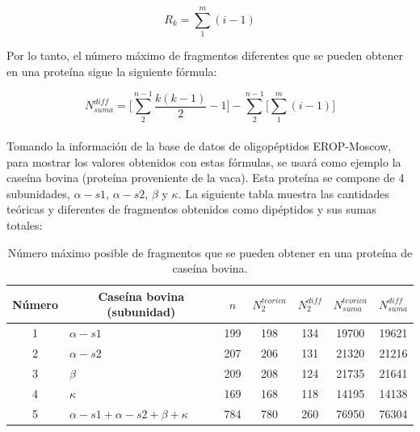 \begin{equation}
R_{k}=\sum_{1}^{m}(i-1)
\end{equation}

Por lo tanto, el número máximo de fragmentos diferentes que se pueden obtener en una proteína sigue la siguiente fórmula:

\begin{equation}
N_{suma}^{diff}=\Bigg[\sum_{2}^{n-1} \frac{k(k-1)}{2}-1\Bigg]- \sum_{2}^{n-1}\Bigg[\sum_{1}^{m}(i-1)\Bigg]
\end{equation}
\\
Tomando la información de la base de datos de oligopéptidos EROP-Moscow, para mostrar los valores obtenidos con estas fórmulas, se usará como ejemplo la caseína bovina (proteína proveniente de la vaca). Esta proteína se compone de 4 subunidades, $\alpha - s1$, $\alpha -s2$, $\beta$ y $\kappa$. La siguiente tabla muestra las cantidades teóricas y diferentes de fragmentos obtenidos como dipéptidos y sus sumas totales:

\begin{table}[H]
\centering
\label{my-label4}
\begin{tabular}{|c|l|c|c|c|c|c|}
\hline
Número & \multicolumn{1}{c|}{Caseína bovina (subunidad)} & $n$ & $N_{2}^{teorica}$ & \multicolumn{1}{l|}{$N_{2}^{diff}$} & \multicolumn{1}{l|}{$N_{suma}^{teorica}$} & \multicolumn{1}{l|}{$N_{suma}^{diff}$} \\ \hline
1      & $\alpha - s1$                                   & 199 & 198               & 134                                 & 19700                                     & 19621                                  \\
2      & $\alpha - s2$                                   & 207 & 206               & 131                                 & 21320                                     & 21216                                  \\
3      & $\beta$                                         & 209 & 208               & 124                                 & 21735                                     & 21641                                  \\
4      & $\kappa$                                        & 169 & 168               & 118                                 & 14195                                     & 14138                                  \\
5      & $\alpha - s1 + \alpha - s2 + \beta + \kappa$    & 784 & 780               & 260                                 & 76950                                     & 76304                                  \\ \hline
\end{tabular}
\caption{Número máximo posible de fragmentos que se pueden obtener en una proteína de caseína bovina.}
\end{table}

